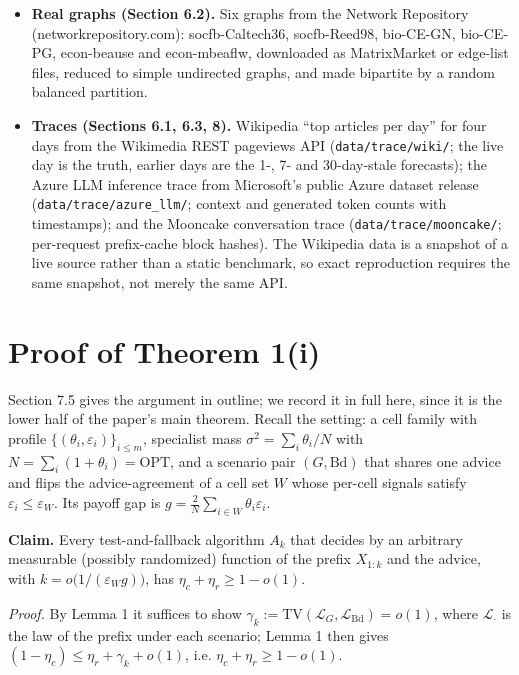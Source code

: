 \begin{itemize}
\tightlist
\item
  \textbf{Real graphs (Section 6.2).} Six graphs from the Network
  Repository (networkrepository.com): socfb-Caltech36, socfb-Reed98,
  bio-CE-GN, bio-CE-PG, econ-beause and econ-mbeaflw, downloaded as
  MatrixMarket or edge-list files, reduced to simple undirected graphs,
  and made bipartite by a random balanced partition.
\item
  \textbf{Traces (Sections 6.1, 6.3, 8).} Wikipedia ``top articles per
  day'' for four days from the Wikimedia REST pageviews API
  (\texttt{data/trace/wiki/}; the live day is the truth, earlier days
  are the 1-, 7- and 30-day-stale forecasts); the Azure LLM inference
  trace from Microsoft's public Azure dataset release
  (\texttt{data/trace/azure\_llm/}; context and generated token counts
  with timestamps); and the Mooncake conversation trace
  (\texttt{data/trace/mooncake/}; per-request prefix-cache block
  hashes). The Wikipedia data is a snapshot of a live source rather than
  a static benchmark, so exact reproduction requires the same snapshot,
  not merely the same API.
\end{itemize}

\section{Proof of Theorem 1(i)}

Section 7.5 gives the argument in outline; we record it in full here,
since it is the lower half of the paper's main theorem. Recall the
setting: a cell family with profile
\(\{(\theta_i,\varepsilon_i)\}_{i\le m}\), specialist mass
\(\sigma^2 = \sum_i\theta_i/N\) with
\(N=\sum_i(1+\theta_i)=\mathrm{OPT}\), and a scenario pair
\((G,\mathrm{Bd})\) that shares one advice and flips the
advice-agreement of a cell set \(W\) whose per-cell signals satisfy
\(\varepsilon_i \le \varepsilon_W\). Its payoff gap is
\(g=\tfrac2N\sum_{i\in W}\theta_i\varepsilon_i\).

\textbf{Claim.} Every test-and-fallback algorithm \(A_k\) that decides
by an arbitrary measurable (possibly randomized) function of the prefix
\(X_{1:k}\) and the advice, with \(k=o\!\big(1/(\varepsilon_W g)\big)\),
has \(\eta_c+\eta_r \ge 1-o(1)\).

\emph{Proof.} By Lemma 1 it suffices to show
\(\gamma_k := \mathrm{TV}(\mathcal L_G,\mathcal
L_{\mathrm{Bd}}) = o(1)\), where \(\mathcal L_\cdot\) is the law of the
prefix under each scenario; Lemma 1 then gives
\((1-\eta_c)\le\eta_r+\gamma_k+o(1)\), i.e. \(\eta_c+\eta_r\ge 1-o(1)\).

